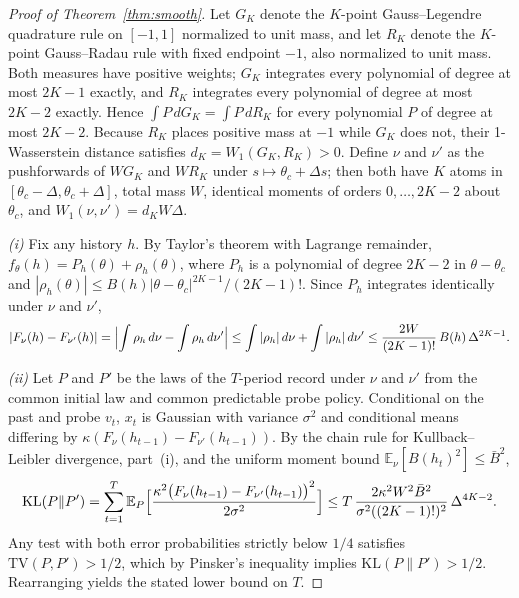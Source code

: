 \documentclass[11pt,letterpaper]{article}
\theoremstyle{definition}
\newcommand{\E}{\mathbb{E}}
\newcommand{\KL}{\mathrm{KL}}
\newcommand{\TV}{\mathrm{TV}}
\begin{document}
\begin{proof}[Proof of Theorem~\ref{thm:smooth}]
Let $G_K$ denote the $K$-point Gauss--Legendre quadrature rule on $[-1, 1]$ normalized to unit mass, and let $R_K$ denote the $K$-point Gauss--Radau rule with fixed endpoint $-1$, also normalized to unit mass. Both measures have positive weights; $G_K$ integrates every polynomial of degree at most $2K - 1$ exactly, and $R_K$ integrates every polynomial of degree at most $2K - 2$ exactly. Hence $\int P\, dG_K = \int P\, dR_K$ for every polynomial $P$ of degree at most $2K - 2$. Because $R_K$ places positive mass at $-1$ while $G_K$ does not, their 1-Wasserstein distance satisfies $d_K = W_1(G_K, R_K) > 0$. Define $\nu$ and $\nu'$ as the pushforwards of $W G_K$ and $W R_K$ under $s \mapsto \theta_c + \Delta s$; then both have $K$ atoms in $[\theta_c - \Delta, \theta_c + \Delta]$, total mass $W$, identical moments of orders $0, \dots, 2K - 2$ about $\theta_c$, and $W_1(\nu, \nu') = d_K W \Delta$.

\emph{(i)} Fix any history $h$. By Taylor's theorem with Lagrange remainder, $f_\theta(h) = P_h(\theta) + \rho_h(\theta)$, where $P_h$ is a polynomial of degree $2K - 2$ in $\theta - \theta_c$ and $|\rho_h(\theta)| \le B(h)|\theta - \theta_c|^{2K-1}/(2K - 1)!$. Since $P_h$ integrates identically under $\nu$ and $\nu'$,
\[
  |F_\nu(h) - F_{\nu'}(h)|
  = \Bigl|\int \rho_h\, d\nu - \int \rho_h\, d\nu'\Bigr|
  \le \int |\rho_h|\, d\nu + \int |\rho_h|\, d\nu'
  \le \frac{2W}{(2K - 1)!}\, B(h)\, \Delta^{2K-1}.
\]

\emph{(ii)} Let $P$ and $P'$ be the laws of the $T$-period record under $\nu$ and $\nu'$ from the common initial law and common predictable probe policy. Conditional on the past and probe $v_t$, $x_t$ is Gaussian with variance $\sigma^2$ and conditional means differing by $\kappa(F_\nu(h_{t-1}) - F_{\nu'}(h_{t-1}))$. By the chain rule for Kullback--Leibler divergence, part~(i), and the uniform moment bound $\E_\nu[B(h_t)^2] \le \bar{B}^2$,
\[
  \KL(P \| P')
  = \sum_{t=1}^T \E_P\Bigl[\frac{\kappa^2 \bigl(F_\nu(h_{t-1}) - F_{\nu'}(h_{t-1})\bigr)^2}{2\sigma^2}\Bigr]
  \le T\, \frac{2 \kappa^2 W^2 \bar{B}^2}{\sigma^2 ((2K - 1)!)^2}\, \Delta^{4K-2}.
\]
Any test with both error probabilities strictly below $1/4$ satisfies $\TV(P, P') > 1/2$, which by Pinsker's inequality implies $\KL(P \| P') > 1/2$. Rearranging yields the stated lower bound on $T$.
\end{proof}
\end{document}
